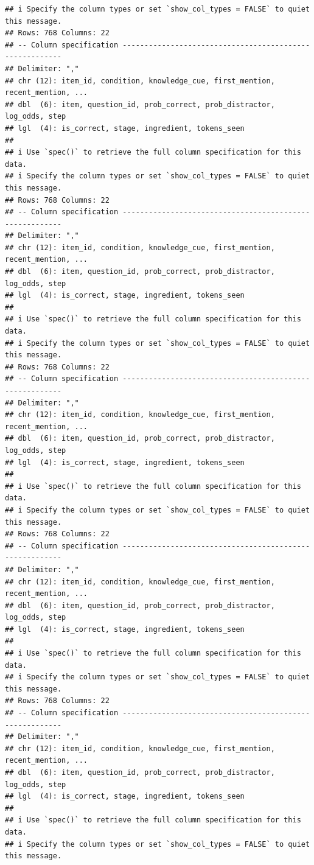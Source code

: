 \documentclass[
]{article}
\begin{document}
\begin{verbatim}
## i Specify the column types or set `show_col_types = FALSE` to quiet this message.
## Rows: 768 Columns: 22
## -- Column specification --------------------------------------------------------
## Delimiter: ","
## chr (12): item_id, condition, knowledge_cue, first_mention, recent_mention, ...
## dbl  (6): item, question_id, prob_correct, prob_distractor, log_odds, step
## lgl  (4): is_correct, stage, ingredient, tokens_seen
## 
## i Use `spec()` to retrieve the full column specification for this data.
## i Specify the column types or set `show_col_types = FALSE` to quiet this message.
## Rows: 768 Columns: 22
## -- Column specification --------------------------------------------------------
## Delimiter: ","
## chr (12): item_id, condition, knowledge_cue, first_mention, recent_mention, ...
## dbl  (6): item, question_id, prob_correct, prob_distractor, log_odds, step
## lgl  (4): is_correct, stage, ingredient, tokens_seen
## 
## i Use `spec()` to retrieve the full column specification for this data.
## i Specify the column types or set `show_col_types = FALSE` to quiet this message.
## Rows: 768 Columns: 22
## -- Column specification --------------------------------------------------------
## Delimiter: ","
## chr (12): item_id, condition, knowledge_cue, first_mention, recent_mention, ...
## dbl  (6): item, question_id, prob_correct, prob_distractor, log_odds, step
## lgl  (4): is_correct, stage, ingredient, tokens_seen
## 
## i Use `spec()` to retrieve the full column specification for this data.
## i Specify the column types or set `show_col_types = FALSE` to quiet this message.
## Rows: 768 Columns: 22
## -- Column specification --------------------------------------------------------
## Delimiter: ","
## chr (12): item_id, condition, knowledge_cue, first_mention, recent_mention, ...
## dbl  (6): item, question_id, prob_correct, prob_distractor, log_odds, step
## lgl  (4): is_correct, stage, ingredient, tokens_seen
## 
## i Use `spec()` to retrieve the full column specification for this data.
## i Specify the column types or set `show_col_types = FALSE` to quiet this message.
## Rows: 768 Columns: 22
## -- Column specification --------------------------------------------------------
## Delimiter: ","
## chr (12): item_id, condition, knowledge_cue, first_mention, recent_mention, ...
## dbl  (6): item, question_id, prob_correct, prob_distractor, log_odds, step
## lgl  (4): is_correct, stage, ingredient, tokens_seen
## 
## i Use `spec()` to retrieve the full column specification for this data.
## i Specify the column types or set `show_col_types = FALSE` to quiet this message.
\end{verbatim}
\end{document}
